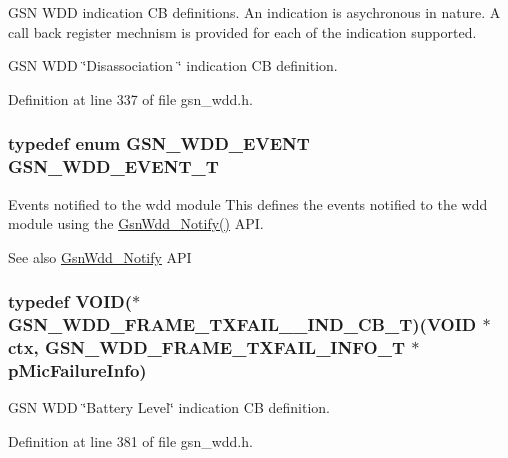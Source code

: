 GSN WDD indication CB definitions. An indication is asychronous in nature. A call back register mechnism is provided for each of the indication supported. 

GSN WDD \char`\"{}Disassociation \char`\"{} indication CB definition. 

Definition at line 337 of file gsn\_\-wdd.h.

\hypertarget{a00677_ga82734573aab1decd3ffd115af490f892}{
\subsubsection[{GSN\_\-WDD\_\-EVENT\_\-T}]{\setlength{\rightskip}{0pt plus 5cm}typedef enum {\bf GSN\_\-WDD\_\-EVENT} {\bf GSN\_\-WDD\_\-EVENT\_\-T}}}
\label{a00677_ga82734573aab1decd3ffd115af490f892}


Events notified to the wdd module This defines the events notified to the wdd module using the \hyperlink{a00677_ga3b57a234af35c0dc77fa3760a2f3f07f}{GsnWdd\_\-Notify()} API. 

\begin{DoxySeeAlso}{See also}
\hyperlink{a00677_ga3b57a234af35c0dc77fa3760a2f3f07f}{GsnWdd\_\-Notify} API 
\end{DoxySeeAlso}
\hypertarget{a00677_ga7e71a759def3d63d0aff2122a2b21bef}{
\subsubsection[{GSN\_\-WDD\_\-FRAME\_\-TXFAIL\_\-\_\-IND\_\-CB\_\-T}]{\setlength{\rightskip}{0pt plus 5cm}typedef VOID($\ast$ {\bf GSN\_\-WDD\_\-FRAME\_\-TXFAIL\_\-\_\-IND\_\-CB\_\-T})(VOID $\ast$ctx, {\bf GSN\_\-WDD\_\-FRAME\_\-TXFAIL\_\-INFO\_\-T} $\ast$pMicFailureInfo)}}
\label{a00677_ga7e71a759def3d63d0aff2122a2b21bef}


GSN WDD \char`\"{}Battery Level\char`\"{} indication CB definition. 



Definition at line 381 of file gsn\_\-wdd.h.

